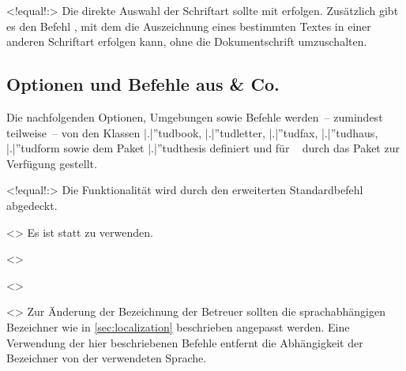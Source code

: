 \begin{DeclareEntity}{}
\begin{NoIndexDefault}
\begin{Declaration}
  {}
  <!equal!:>
\printdeclarationlist
%
Die direkte Auswahl der Schriftart sollte mit  erfolgen. 
Zusätzlich gibt es den Befehl , mit dem die Auszeichnung 
eines bestimmten Textes in einer anderen Schriftart erfolgen kann, ohne die 
Dokumentschrift umzuschalten.
\end{Declaration}
%



\subsection{Optionen und Befehle aus  \& Co.}
%
Die nachfolgenden Optionen, Umgebungen sowie Befehle werden~-- zumindest 
teilweise~-- von den Klassen \Class|.|''{tudbook}, \Class|.|''{tudletter}, 
\Class|.|''{tudfax}, \Class|.|''{tudhaus}, \Class|.|''{tudform} sowie dem Paket 
\Package|.|''{tudthesis} definiert und für \TUDScript~\vTUDScript{} durch das 
Paket  zur Verfügung gestellt.

\begin{Declaration}
  {}
  <!equal!:>
\printdeclarationlist
%
Die Funktionalität wird durch den erweiterten Standardbefehl  
abgedeckt.
\end{Declaration}

\begin{Declaration}
  {}
  <>
\printdeclarationlist
%
Es ist 
statt  zu verwenden.
\end{Declaration}

\begin{Declaration}
  {}
  <>
\begin{Declaration}
  {}
  <>
\begin{Declaration}
  {}
  <>
\printdeclarationlist
%
Zur Änderung der Bezeichnung der Betreuer sollten die sprachabhängigen 
Bezeichner wie in \autoref{sec:localization} beschrieben angepasst werden. Eine 
Verwendung der hier beschriebenen Befehle entfernt die Abhängigkeit der 
Bezeichner von der verwendeten Sprache.
\end{Declaration}
\end{Declaration}
\end{Declaration}


\end{NoIndexDefault}
\end{DeclareEntity}
